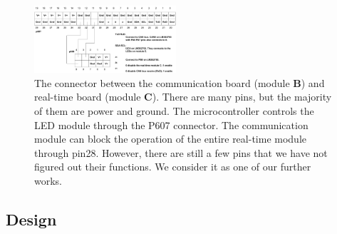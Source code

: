 \begin{figure}[th]
	\includegraphics[width=0.47\textwidth]{figures/p607-2}
	\centering
	\caption{The connector between the communication board (module \textbf{B}) and real-time board (module \textbf{C}).  There are many pins, but the majority of them are power and ground. The microcontroller controls the LED module through the P607 connector.  The communication module can block the operation of the entire real-time module through pin28. However, there are still a few pins that we have not figured out their functions. We consider it as one of our further works.}
	\label{fig:p607}
\end{figure}

%
%
%
%


\subsection{Design}

